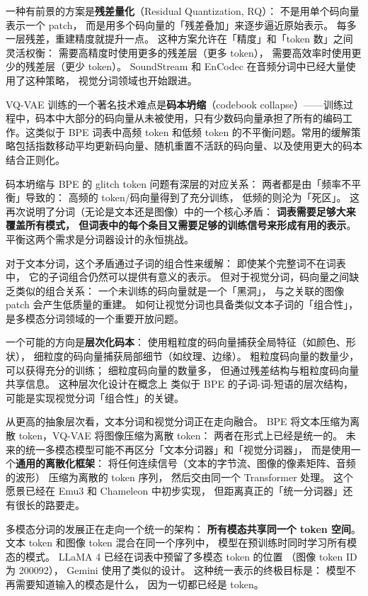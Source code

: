 一种有前景的方案是\textbf{残差量化}（Residual Quantization, RQ）：
不是用单个码向量表示一个 patch，
而是用多个码向量的「残差叠加」来逐步逼近原始表示。
每多一层残差，重建精度就提升一点。
这种方案允许在「精度」和「token 数」之间灵活权衡：
需要高精度时使用更多的残差层（更多 token），
需要高效率时使用更少的残差层（更少 token）。
SoundStream 和 EnCodec 在音频分词中已经大量使用了这种策略，
视觉分词领域也开始跟进。

VQ-VAE 训练的一个著名技术难点是\textbf{码本坍缩}（codebook collapse）——训练过程中，码本中大部分的码向量从未被使用，只有少数码向量承担了所有的编码工作。这类似于 BPE 词表中高频 token 和低频 token 的不平衡问题。常用的缓解策略包括指数移动平均更新码向量、随机重置不活跃的码向量、以及使用更大的码本结合正则化。

码本坍缩与 BPE 的 glitch token 问题有深层的对应关系：
两者都是由「频率不平衡」导致的：
高频的 token/码向量得到了充分训练，
低频的则沦为「死区」。
这再次说明了分词（无论是文本还是图像）中的一个核心矛盾：
\textbf{词表需要足够大来覆盖所有模式，
但词表中的每个条目又需要足够的训练信号来形成有用的表示}。
平衡这两个需求是分词器设计的永恒挑战。

对于文本分词，这个矛盾通过子词的组合性来缓解：
即使某个完整词不在词表中，
它的子词组合仍然可以提供有意义的表示。
但对于视觉分词，码向量之间缺乏类似的组合关系：
一个未训练的码向量就是一个「黑洞」，
与之关联的图像 patch 会产生低质量的重建。
如何让视觉分词也具备类似文本子词的「组合性」，
是多模态分词领域的一个重要开放问题。

一个可能的方向是\textbf{层次化码本}：
使用粗粒度的码向量捕获全局特征（如颜色、形状），
细粒度的码向量捕获局部细节（如纹理、边缘）。
粗粒度码向量的数量少，
可以获得充分的训练；
细粒度码向量的数量多，
但通过残差结构与粗粒度码向量共享信息。
这种层次化设计在概念上
类似于 BPE 的子词-词-短语的层次结构，
可能是实现视觉分词「组合性」的关键。

从更高的抽象层次看，文本分词和视觉分词正在走向融合。
BPE 将文本压缩为离散 token，VQ-VAE 将图像压缩为离散 token：
两者在形式上已经是统一的。
未来的统一多模态模型可能不再区分「文本分词器」和「视觉分词器」，
而是使用一个\textbf{通用的离散化框架}：
将任何连续信号（文本的字节流、图像的像素矩阵、音频的波形）
压缩为离散的 token 序列，
然后交由同一个 Transformer 处理。
这个愿景已经在 Emu3 和 Chameleon 中初步实现，
但距离真正的「统一分词器」还有很长的路要走。

\begin{corebox}[多模态分词的统一愿景]
多模态分词的发展正在走向一个统一的架构：
\textbf{所有模态共享同一个 token 空间}。
文本 token 和图像 token 混合在同一个序列中，
模型在预训练时同时学习所有模态的模式。
LLaMA 4 已经在词表中预留了多模态 token 的位置
（图像 token ID 为 200092），
Gemini 使用了类似的设计。
这种统一表示的终极目标是：
模型不再需要知道输入的模态是什么，
因为一切都已经是 token。
\end{corebox}

